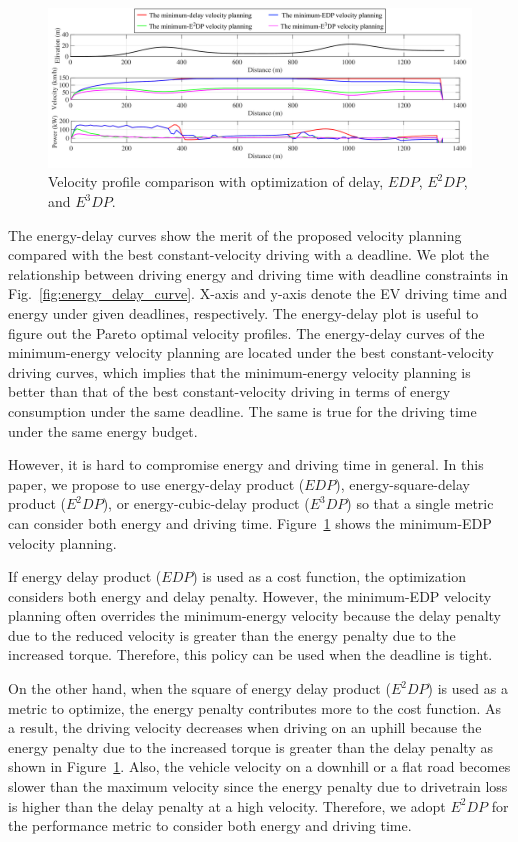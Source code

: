 \documentclass{IEEEtran}
\begin{document}
\begin{figure} %
\centering
\includegraphics[width=1.0\hsize]{Figures/EDP_velocity_planning.pdf}
\caption{Velocity profile comparison with optimization of delay, $EDP$, $E^2DP$, and $E^3DP$.}
\label{fig:minimum_EDP_velocity_planning}
\end{figure} 


The energy-delay curves show the merit of the proposed velocity planning compared with the best constant-velocity driving with a deadline. We plot the relationship between driving energy and driving time with deadline constraints in Fig.~\ref{fig:energy_delay_curve}. X-axis and y-axis denote the EV driving time and energy under given deadlines, respectively. The energy-delay plot is useful to figure out the Pareto optimal velocity profiles. The energy-delay curves of the minimum-energy velocity planning are located under the best constant-velocity driving curves, which implies that the minimum-energy velocity planning is better than that of the best constant-velocity driving in terms of energy consumption under the same deadline. The same is true for the driving time under the same energy budget.

However, it is hard to compromise energy and driving time in general. In this paper, we propose to use energy-delay product ($EDP$), energy-square-delay product ($E^2DP$), or energy-cubic-delay product ($E^3DP$) so that a single metric can consider both energy and driving time. Figure~\ref{fig:minimum_EDP_velocity_planning} shows the minimum-EDP velocity planning. 

If energy delay product ($EDP$) is used as a cost function, the optimization considers both energy and delay penalty. However, the minimum-EDP velocity planning often overrides the minimum-energy velocity because the delay penalty due to the reduced velocity is greater than the energy penalty due to the increased torque. Therefore, this policy can be used when the deadline is tight. 

On the other hand, when the square of energy delay product ($E^2DP$) is used as a metric to optimize, the energy penalty contributes more to the cost function. As a result, the driving velocity decreases when driving on an uphill because the energy penalty due to the increased torque is greater than the delay penalty as shown in Figure~\ref{fig:minimum_EDP_velocity_planning}. Also, the vehicle velocity on a downhill or a flat road becomes slower than the maximum velocity since the energy penalty due to drivetrain loss is higher than the delay penalty at a high velocity. Therefore, we adopt $E^2DP$ for the performance metric to consider both energy and driving time.
\end{document}
